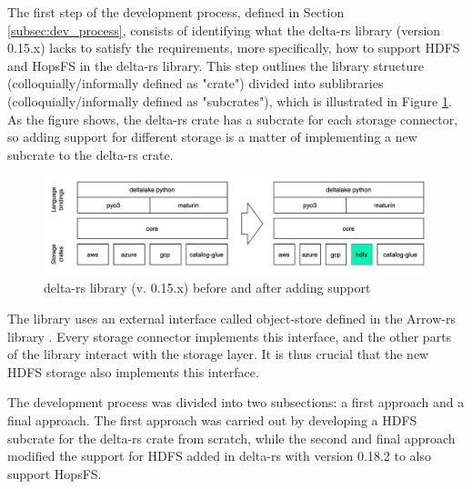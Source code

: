 
The first step of the development process, defined in Section \ref{subsec:dev_process}, consists of identifying what the delta-rs library (version 0.15.x) lacks to satisfy the requirements, more specifically, how to support \gls{HDFS} and \gls{HopsFS} in the delta-rs \cite{DeltaioDeltars2024} library. This step outlines the library structure (colloquially/informally defined as "crate") divided into sublibraries (colloquially/informally defined as "subcrates"), which is illustrated in Figure \ref{fig:delta-rs_schema}. As the figure shows, the delta-rs crate has a subcrate for each storage connector, so adding support for different storage is a matter of implementing a new subcrate to the delta-rs crate.

\begin{figure}[!ht]
    \begin{center}
      \includegraphics[width=\textwidth]{figures/4-implementation/delta-rs_schema.png}
    \caption{delta-rs library (v. 0.15.x) before and after adding  support}
    \label{fig:delta-rs_schema}
    \end{center}
\end{figure}

The library uses an external interface called object-store defined in the Arrow-rs library \cite{ArrowrsObject_storeREADMEmd}. Every storage connector implements this interface, and the other parts of the library interact with the storage layer. It is thus crucial that the new \gls{HDFS} storage also implements this interface.

The development process was divided into two subsections: a first approach and a final approach. The first approach was carried out by developing a \gls{HDFS} subcrate for the delta-rs crate from scratch, while the second and final approach modified the support for \gls{HDFS} added in delta-rs with version 0.18.2 to also support \gls{HopsFS}.

